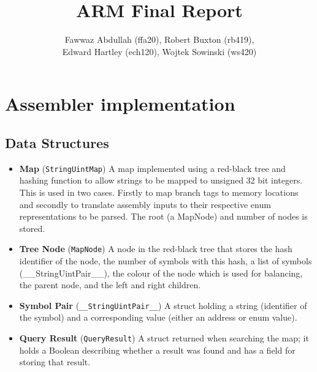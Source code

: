 \documentclass[8pt]{article}
\begin{document}
\title{ARM Final Report}
\author{Fawwaz Abdullah (ffa20), Robert Buxton (rb419), \\Edward Hartley (ech120), Wojtek Sowinski (ws420) }

\maketitle

\section{Assembler implementation}

\subsection{Data Structures}

\begin{itemize}

    \item \textbf{Map} (\texttt{StringUintMap}) A map implemented using a
    red-black tree and hashing function to allow strings to be mapped to unsigned
    32 bit integers. This is used in two cases. Firstly to map branch tags to
    memory locations and secondly to translate assembly inputs to their respective
    enum representations to be parsed. The root (a MapNode) and number of nodes is stored.

    \item \textbf{Tree Node} (\texttt{MapNode}) A node in the red-black tree that
    stores the hash identifier of the node, the number of symbols with this hash,
    a list of symbols (\_\_StringUintPair\_\_), the colour of the node which is used for balancing, the
    parent node, and the left and right children.

    \item \textbf{Symbol Pair} (\texttt{\_\_StringUintPair\_\_}) A struct holding a
    string (identifier of the symbol) and a corresponding value (either an
    address or enum value).

    \item \textbf{Query Result} (\texttt{QueryResult}) A struct returned when searching the map;
    it holds a Boolean describing whether a result was found and has a field for storing that result.

\end{itemize}
\end{document}
